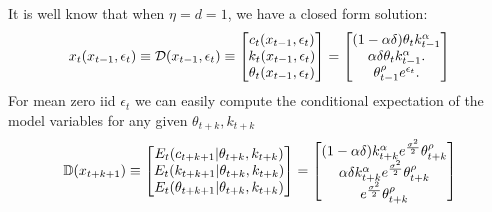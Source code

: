 \documentclass[12pt]{article}
\begin{document}
It is well know that when $\eta=d=1$, we have a closed form solution\citep{lettau03}:
\begin{gather}
x_t({x_{t-1},\epsilon_t})\equiv    \mathcal{D}({x_{t-1},\epsilon_t})\equiv
   \begin{bmatrix}
     c_t({x_{t-1},\epsilon_t})\\k_t({x_{t-1},\epsilon_t})\\ \theta_t({x_{t-1},\epsilon_t})
   \end{bmatrix}=
   \begin{bmatrix}
(1-\alpha \delta) \theta_{t} k_{t-1}^\alpha\\
  \alpha \delta \theta_{t} k_{t-1}^\alpha.\label{soln}\\
\theta_{t-1}^\rho e^{\epsilon_t}.
   \end{bmatrix}
\end{gather}
For mean zero iid $\epsilon_t$ we can easily 
compute the conditional expectation of the model variables for any given $\theta_{t+k},k_{t+k}$
\begin{gather*}
  \mathbb{D}(x_{t+k+1})\equiv
  \begin{bmatrix}
  E_t(c_{t+k+1}|\theta_{t+k},k_{t+k})\\
  E_t(k_{t+k+1}|\theta_{t+k},k_{t+k})\\
  E_t(\theta_{t+k+1}|\theta_{t+k},k_{t+k})
  \end{bmatrix}=
  \begin{bmatrix}
(1-\alpha\delta)k_{t+k}^\alpha e^{\frac{\sigma^2}{2}}\theta_{t+k}^\rho\\
\alpha\delta k_{t+k}^\alpha e^{\frac{\sigma^2}{2}}\theta_{t+k}^\rho\\
e^{\frac{\sigma^2}{2}}\theta_{t+k}^\rho
  \end{bmatrix}
\end{gather*}
\end{document}

